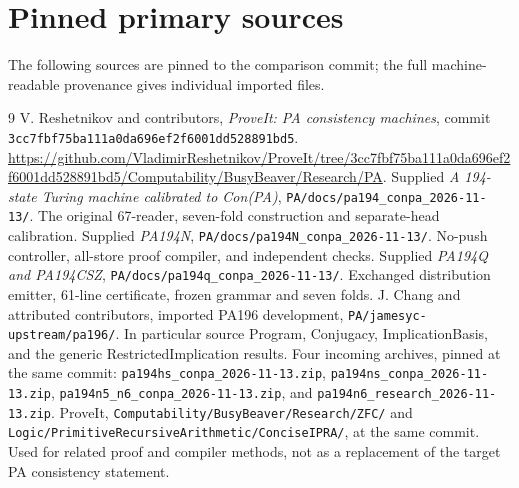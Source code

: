 \documentclass[10pt,letterpaper]{article}
\newcommand{\file}[1]{\nolinkurl{#1}}
\begin{document}
\clearpage
\section{Pinned primary sources}

The following sources are pinned to the comparison commit; the full
machine-readable provenance gives individual imported files.
\begin{thebibliography}{9}
V. Reshetnikov and contributors, \emph{ProveIt: PA consistency machines},
commit \texttt{3cc7fbf75ba111a0da696ef2f6001dd528891bd5}.
\url{https://github.com/VladimirReshetnikov/ProveIt/tree/3cc7fbf75ba111a0da696ef2f6001dd528891bd5/Computability/BusyBeaver/Research/PA}.
Supplied \emph{A 194-state Turing machine calibrated to Con(PA)},
\file{PA/docs/pa194_conpa_2026-11-13/}. The original 67-reader,
seven-fold construction and separate-head calibration.
Supplied \emph{PA194N}, \file{PA/docs/pa194N_conpa_2026-11-13/}.
No-push controller, all-store proof compiler, and independent checks.
Supplied \emph{PA194Q and PA194CSZ},
\file{PA/docs/pa194q_conpa_2026-11-13/}. Exchanged distribution emitter,
61-line certificate, frozen grammar and seven folds.
J. Chang and attributed contributors, imported PA196 development,
\file{PA/jamesyc-upstream/pa196/}. In particular source Program,
Conjugacy, ImplicationBasis, and the generic RestrictedImplication results.
Four incoming archives, pinned at the same commit:
\file{pa194hs_conpa_2026-11-13.zip},
\file{pa194ns_conpa_2026-11-13.zip},
\file{pa194n5_n6_conpa_2026-11-13.zip}, and
\file{pa194n6_research_2026-11-13.zip}.
ProveIt, \file{Computability/BusyBeaver/Research/ZFC/} and
\file{Logic/PrimitiveRecursiveArithmetic/ConciseIPRA/}, at the same commit.
Used for related proof and compiler methods, not as a replacement of the
target PA consistency statement.
\end{thebibliography}
\end{document}
